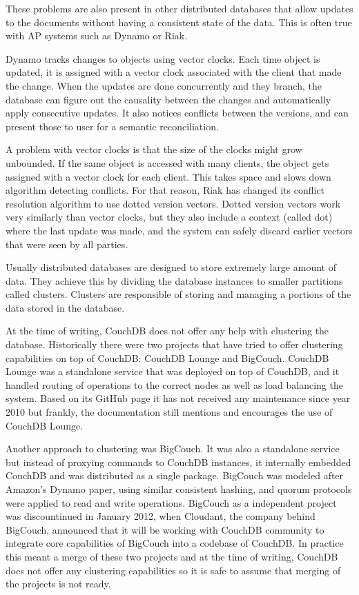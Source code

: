These problems are also present in other distributed databases that allow
updates to the documents without having a consistent state of the data. This is
often true with AP systems such as Dynamo or Riak.

Dynamo tracks changes to objects using vector clocks. Each time object is
updated, it is assigned with a vector clock associated with the client that made
the change. When the updates are done concurrently and they branch, the database
can figure out the causality between the changes and automatically apply
consecutive updates. It also notices conflicts between the versions, and can
present those to user for a semantic reconciliation.

A problem with vector clocks is that the size of the clocks might grow
unbounded. If the same object is accessed with many clients, the object gets
assigned with a vector clock for each client. This takes space and slows down
algorithm detecting conflicts. For that reason, Riak has changed its conflict
resolution algorithm to use dotted version vectors\cite{preguicca2010dotted}.
Dotted version vectors work very similarly than vector clocks, but they also
include a context (called dot) where the last update was made, and the system
can safely discard earlier vectors that were seen by all parties.

Usually distributed databases are designed to store extremely large amount of
data. They achieve this by dividing the database instances to smaller partitions
called clusters. Clusters are responsible of storing and managing a portions of
the data stored in the database.

At the time of writing, CouchDB does not offer any help with clustering the
database. Historically there were two projects that have tried to offer
clustering capabilities on top of CouchDB\@: CouchDB Lounge and BigCouch.
CouchDB Lounge was a standalone service that was deployed on top of CouchDB, and
it handled routing of operations to the correct nodes as well as load balancing
the system. Based on its GitHub page\cite{couchdbloungegithub} it has not
received any maintenance since year 2010 but frankly, the documentation still
mentions and encourages the use of CouchDB Lounge.

Another approach to clustering was BigCouch. It was also a standalone service
but instead of proxying commands to CouchDB instances, it internally embedded
CouchDB and was distributed as a single package. BigCouch was modeled after
Amazon's Dynamo paper\cite{decandia2007dynamo}, using similar consistent
hashing, and quorum protocols were applied to read and write operations.
BigCouch as a independent project was discountinued in January 2012, when
Cloudant, the company behind BigCouch, announced that it will be working with
CouchDB community to integrate core capabilities of BigCouch into a codebase of
CouchDB\@. In practice this meant a merge of these two projects and at the time
of writing, CouchDB does not offer any clustering capabilities so it is safe to
assume that merging of the projects is not ready.
